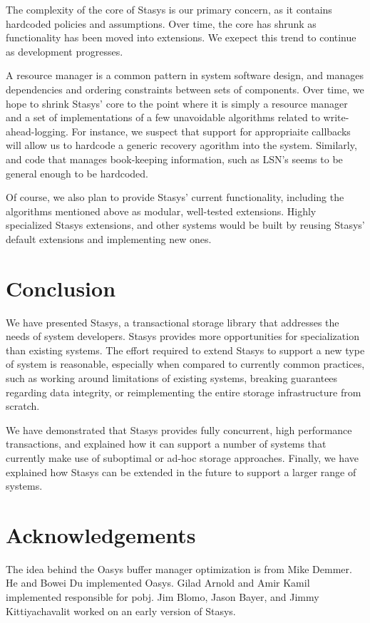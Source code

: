 \documentclass[letterpaper,twocolumn,10pt]{article}
\newcommand{\yad}{Stasys\xspace}
\newcommand{\yads}{Stasys'\xspace}
\newcommand{\oasys}{Oasys\xspace}
\begin{document}
The complexity of the core of \yad is our primary concern, as it
contains hardcoded policies and assumptions.  Over time, the core has
shrunk as functionality has been moved into extensions.  We exepect
this trend to continue as development progresses.  

A resource manager
is a common pattern in system software design, and manages
dependencies and ordering constraints between sets of components.
Over time, we hope to shrink \yads core to the point where it is
simply a resource manager and a set of implementations of a few unavoidable
algorithms related to write-ahead-logging.  For instance, 
we suspect that support for appropriaite callbacks will 
allow us to hardcode a generic recovery agorithm into the 
system.  Similarly, and code that manages book-keeping information, such as 
LSN's seems to be general enough to be hardcoded.  

Of course, we also plan to provide \yads current functionality, including the algorithms
mentioned above as modular, well-tested extensions.
Highly specialized \yad extensions, and other systems would be built
by reusing \yads default extensions and implementing new ones.


\section{Conclusion}

We have presented \yad, a transactional storage library that addresses
the needs of system developers.  \yad provides more opportunities for
specialization than existing systems.  The effort required to extend
\yad to support a new type of system is reasonable, especially when
compared to currently common practices, such as working around
limitations of existing systems, breaking guarantees regarding data
integrity, or reimplementing the entire storage infrastructure from
scratch.

We have demonstrated that \yad provides fully
concurrent, high performance transactions, and explained how it can
support a number of systems that currently make use of suboptimal or
ad-hoc storage approaches.  Finally, we have explained how \yad can be
extended in the future to support a larger range of systems.

\section{Acknowledgements}

The idea behind the \oasys buffer manager optimization is from Mike
Demmer.  He and Bowei Du implemented \oasys.  Gilad Arnold and Amir Kamil implemented
responsible for pobj.  Jim Blomo, Jason Bayer, and Jimmy
Kittiyachavalit worked on an early version of \yad.
\end{document}
